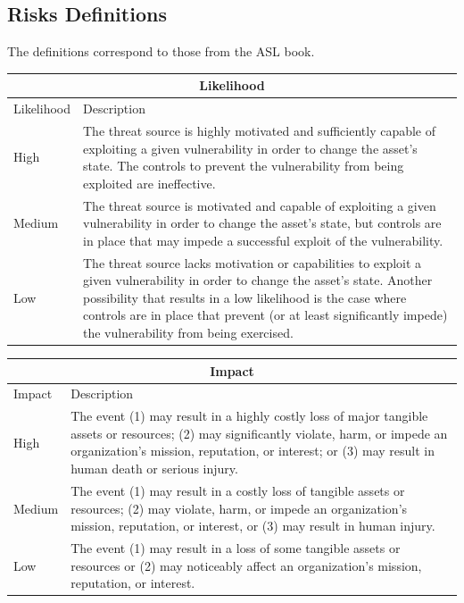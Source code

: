 \documentclass[english]{article}
\begin{document}
\subsection{Risks Definitions}

The definitions correspond to those from the ASL book.


\begin{center}
\begin{tabular}{|l|p{10cm}|}
\hline
\multicolumn{2}{|c|}{\bf Likelihood} \\
\hline
Likelihood & Description \\
\hline
\hline
High   & The threat source is highly motivated and sufficiently capable of
exploiting a given vulnerability in order to change the asset’s state. The
controls to prevent the vulnerability from being exploited are ineffective. \\
\hline
Medium & The threat source is motivated and capable of exploiting a given vulnerability
in order to change the asset’s state, but controls are in place
that may impede a successful exploit of the vulnerability. \\
\hline
Low   & The threat source lacks motivation or capabilities to exploit a given
vulnerability in order to change the asset’s state. Another possibility
that results in a low likelihood is the case where controls are in place
that prevent (or at least significantly impede) the vulnerability from
being exercised. \\
\hline
\end{tabular}
\hspace{3em}
  \begin{tabular}{|l|p{10cm}|}
\hline
\multicolumn{2}{|c|}{\bf Impact} \\
\hline
Impact & Description \\
\hline
\hline
High   & The event (1) may result in a highly costly loss of major tangible assets
or resources; (2) may significantly violate, harm, or impede an
organization’s mission, reputation, or interest; or (3) may result in human death or
serious injury.   \\
\hline
Medium & The event (1) may result in a costly loss of tangible assets or resources;
(2) may violate, harm, or impede an organization’s mission, reputation,
or interest, or (3) may result in human injury. \\
\hline
Low   & The event (1) may result in a loss of some tangible assets or resources or
(2) may noticeably affect an organization’s mission, reputation, or interest. \\
\hline
\end{tabular}
\end{center}
\end{document}

